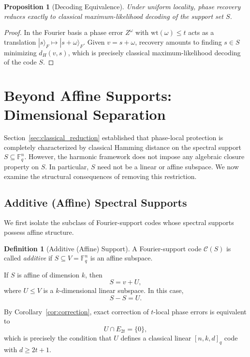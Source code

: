 \documentclass[a4paper,twocolumn,11pt,allowtoday]{quantumarticle}
\theoremstyle{plain}
\newtheorem{proposition}[theorem]{Proposition}
\theoremstyle{definition}
\newtheorem{definition}[theorem]{Definition}
\theoremstyle{remark}
\begin{document}
\begin{proposition}[Decoding Equivalence]
\label{prop:decoding_equivalence}
Under uniform locality, phase recovery reduces exactly to classical maximum-likelihood decoding of the support set $S$.
\end{proposition}


\begin{proof}
In the Fourier basis a phase error $Z^\omega$ with
$\mathrm{wt}(\omega)\le t$ acts as a translation
$|s\rangle_F \mapsto |s+\omega\rangle_F$.
Given $v=s+\omega$, recovery amounts to finding
$s\in S$ minimizing $d_H(v,s)$, which is precisely
classical maximum-likelihood decoding of the code $S$.
\end{proof}




\section{Beyond Affine Supports: Dimensional Separation}
\label{sec:dimensional_separation}

Section~\ref{sec:classical_reduction} established that phase-local protection
is completely characterized by classical Hamming distance on the spectral
support $S \subseteq \mathbb{F}_q^n$. 
However, the harmonic framework does not impose any algebraic closure
property on $S$. In particular, $S$ need not be a linear or affine subspace.
We now examine the structural consequences of removing this restriction.

\subsection{Additive (Affine) Spectral Supports}
\label{subsec:affine_supports}

We first isolate the subclass of Fourier-support codes whose spectral supports
possess affine structure.

\begin{definition}[Additive (Affine) Support]
A Fourier-support code $\mathcal{C}(S)$ is called \emph{additive}
if $S \subseteq V=\mathbb{F}_q^n$ is an affine subspace.
\end{definition}

If $S$ is affine of dimension $k$, then
\[
S = v + U,
\]
where $U \le V$ is a $k$-dimensional linear subspace.
In this case,
\[
S - S = U.
\]

By Corollary~\ref{cor:correction}, exact correction of $t$-local phase errors
is equivalent to
\[
U \cap E_{2t} = \{0\},
\]
which is precisely the condition that $U$ defines a classical linear
$[n,k,d]_q$ code with $d \ge 2t+1$.
\end{document}
